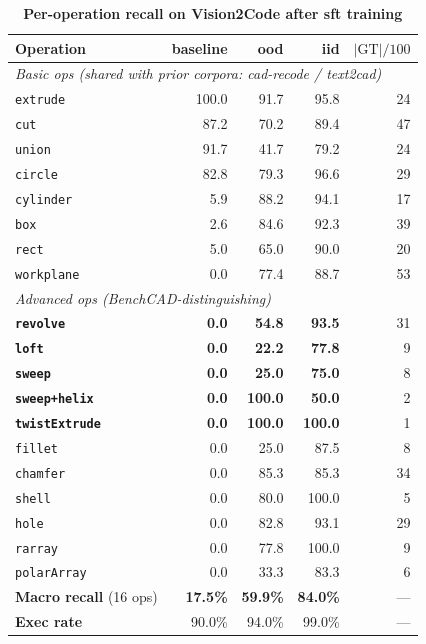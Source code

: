 \begin{table}[t]
    \centering
    \small
    \setlength{\tabcolsep}{4pt}
    \caption{\textbf{Per-operation recall on Vision2Code after sft training}}
    \label{tab:op_recall_sft} 
\begin{tabular}{lrrrr}
\toprule
Operation & baseline & ood & iid & $|\text{GT}|/100$ \\
\midrule
\multicolumn{5}{l}{\emph{Basic ops (shared with prior corpora: cad-recode / text2cad)}} \\
\texttt{extrude}              & 100.0 & 91.7  & 95.8  & 24 \\
\texttt{cut}                  & 87.2  & 70.2  & 89.4  & 47 \\
\texttt{union}                & 91.7  & 41.7  & 79.2  & 24 \\
\texttt{circle}               & 82.8  & 79.3  & 96.6  & 29 \\
\texttt{cylinder}             & 5.9   & 88.2  & 94.1  & 17 \\
\texttt{box}                  & 2.6   & 84.6  & 92.3  & 39 \\
\texttt{rect}                 & 5.0   & 65.0  & 90.0  & 20 \\
\texttt{workplane}            & 0.0   & 77.4  & 88.7  & 53 \\
\midrule
\multicolumn{5}{l}{\emph{Advanced ops (BenchCAD-distinguishing)}} \\
\textbf{\texttt{revolve}}     & \textbf{0.0} & \textbf{54.8} & \textbf{93.5} & 31 \\
\textbf{\texttt{loft}}        & \textbf{0.0} & \textbf{22.2} & \textbf{77.8} &  9 \\
\textbf{\texttt{sweep}}       & \textbf{0.0} & \textbf{25.0} & \textbf{75.0} &  8 \\
\textbf{\texttt{sweep+helix}} & \textbf{0.0} & \textbf{100.0}& \textbf{50.0} &  2 \\
\textbf{\texttt{twistExtrude}}& \textbf{0.0} & \textbf{100.0}& \textbf{100.0}&  1 \\
\texttt{fillet}               & 0.0   & 25.0  & 87.5  &  8 \\
\texttt{chamfer}              & 0.0   & 85.3  & 85.3  & 34 \\
\texttt{shell}                & 0.0   & 80.0  & 100.0 &  5 \\
\texttt{hole}                 & 0.0   & 82.8  & 93.1  & 29 \\
\texttt{rarray}               & 0.0   & 77.8  & 100.0 &  9 \\
\texttt{polarArray}           & 0.0   & 33.3  & 83.3  &  6 \\
\midrule
\textbf{Macro recall} (16 ops) & \textbf{17.5\%} & \textbf{59.9\%} & \textbf{84.0\%} & --- \\
\textbf{Exec rate}             & 90.0\% & 94.0\% & 99.0\%        & --- \\
\bottomrule
\end{tabular}
\end{table}

    